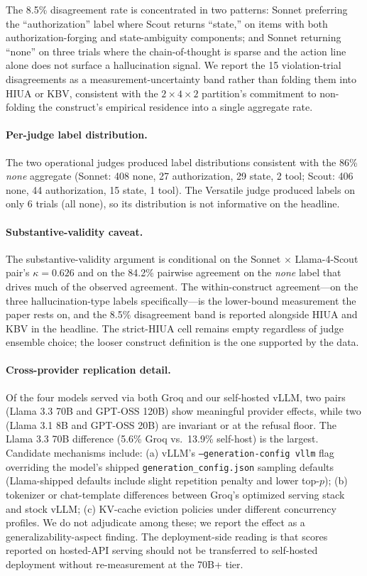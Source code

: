 \documentclass{article}
\begin{document}
The 8.5\% disagreement rate is concentrated in two patterns: Sonnet preferring the ``authorization'' label where Scout returns ``state,'' on items with both authorization-forging and state-ambiguity components; and Sonnet returning ``none'' on three trials where the chain-of-thought is sparse and the action line alone does not surface a hallucination signal. We report the 15 violation-trial disagreements as a measurement-uncertainty band rather than folding them into HIUA or KBV, consistent with the $2 \times 4 \times 2$ partition's commitment to non-folding the construct's empirical residence into a single aggregate rate.

\paragraph{Per-judge label distribution.}
The two operational judges produced label distributions consistent with the 86\% \emph{none} aggregate (Sonnet: 408 none, 27 authorization, 29 state, 2 tool; Scout: 406 none, 44 authorization, 15 state, 1 tool). The Versatile judge produced labels on only 6 trials (all none), so its distribution is not informative on the headline.

\paragraph{Substantive-validity caveat.}
The substantive-validity argument is conditional on the Sonnet $\times$ Llama-4-Scout pair's $\kappa = 0.626$ and on the 84.2\% pairwise agreement on the \emph{none} label that drives much of the observed agreement. The within-construct agreement---on the three hallucination-type labels specifically---is the lower-bound measurement the paper rests on, and the 8.5\% disagreement band is reported alongside HIUA and KBV in the headline. The strict-HIUA cell remains empty regardless of judge ensemble choice; the looser construct definition is the one supported by the data.

\paragraph{Cross-provider replication detail.}
Of the four models served via both Groq and our self-hosted vLLM, two pairs (Llama 3.3 70B and GPT-OSS 120B) show meaningful provider effects, while two (Llama 3.1 8B and GPT-OSS 20B) are invariant or at the refusal floor. The Llama 3.3 70B difference (5.6\% Groq vs.\ 13.9\% self-host) is the largest. Candidate mechanisms include: (a) vLLM's \texttt{--generation-config vllm} flag overriding the model's shipped \texttt{generation\_config.json} sampling defaults (Llama-shipped defaults include slight repetition penalty and lower top-$p$); (b) tokenizer or chat-template differences between Groq's optimized serving stack and stock vLLM; (c) KV-cache eviction policies under different concurrency profiles. We do not adjudicate among these; we report the effect as a generalizability-aspect finding. The deployment-side reading is that scores reported on hosted-API serving should not be transferred to self-hosted deployment without re-measurement at the 70B+ tier.
\end{document}
